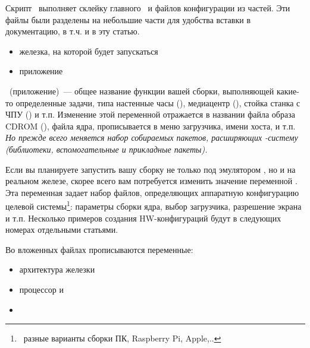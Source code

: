 {

Скрипт \ выполняет склейку главного \ и файлов
конфигурации из частей. Эти файлы были разделены на небольшие части для удобства
вставки в документацию, в т.ч. и в эту статью.



\begin{itemize}
  \item{} железка, на которой будет запускаться
  \item{} приложение
\end{itemize}


\ (приложение)\ --- общее название функции вашей сборки, выполняющей
какие-то определенные задачи, типа настенные часы (), медиацентр
(), стойка станка с ЧПУ () и т.п. Изменение этой
переменной отражается в названии файла образа CDROM (), файла ядра,
прописывается в меню загрузчика, имени хоста, и т.п. \emph{Но прежде всего
меняется набор собираемых пакетов, расширяющих -систему (библиотеки,
вспомогательные и прикладные пакеты).}

Если вы планируете запустить вашу сборку не только под эмулятором ,
но и на реальном железе, скорее всего вам потребуется изменить значение
переменной . Эта переменная задает набор файлов, определяющих
аппаратную конфигурацию целевой системы\footnote{\ разные варианты сборки ПК,
Raspberry Pi, Apple,..}: параметры сборки ядра, выбор загрузчика, разрешение
экрана и т.п. Несколько примеров создания HW-конфигураций будут в следующих
номерах отдельными статьями.

\bigskip
Во вложенных файлах прописываются переменные:

\begin{itemize}
  \item{} архитектура железки
  \item{} процессор и
  \item{} 
\end{itemize}


}
